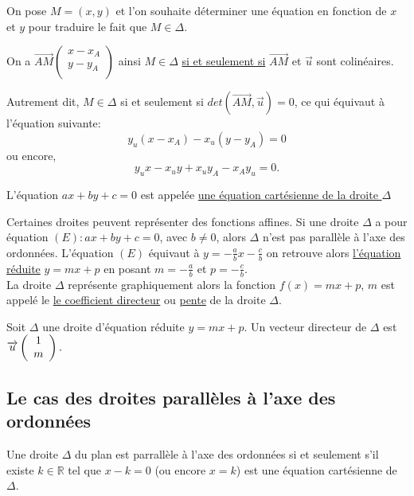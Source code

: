 \documentclass[french]{book}
\begin{document}
On pose $M=(x,y)$ et l'on souhaite déterminer une équation en fonction de $x$ et $y$ pour traduire le fait que $M \in \Delta$. 

On a $\overrightarrow{AM} \left( \begin{array}{c}
x-x_A \\
y-y_A \\
\end{array} \right)  
$ ainsi $M \in \Delta$ \underline{si et seulement si} $\overrightarrow{AM}$ et $\overrightarrow{u}$ sont colinéaires.

Autrement dit, $M \in \Delta$ si et seulement si $det(\overrightarrow{AM},\overrightarrow{u})=0$, ce qui équivaut à l'équation suivante:
 $$y_u(x-x_A) -x_u(y-y_A)=0$$
ou encore, 
$$y_u x - x_u y + x_u y_A - x_A y_u = 0 .$$
 
\begin{defn}
L'équation $ax+by+c=0$ est appelée \underline{une équation cartésienne de la droite $\Delta$}
\vspace{3mm}
\end{defn}

Certaines droites peuvent représenter des fonctions affines. Si une droite $\Delta$ a pour équation $(E): ax+by+c=0$, avec $b \neq 0$, alors $\Delta$ n'est pas parallèle à l'axe des ordonnées. L'équation $(E)$ équivaut à $y=- \frac{a}{b} x - \frac{c}{b}$ on retrouve alors \underline{l'équation réduite}  $y=mx+p$ en posant $m=-\frac{a}{b}$ et $p=-\frac{c}{b}$.\\

La droite $\Delta$ représente graphiquement alors la fonction $f(x)=mx+p$, $m$ est appelé le \underline{ le coefficient directeur} ou \underline{pente} de la droite $\Delta$.

\begin{prop}
Soit $\Delta$ une droite d'équation réduite $y=mx+p$. Un vecteur directeur de $\Delta$ est $\overrightarrow{u} \left( \begin{array}{c}
1 \\
m \\
\end{array} \right). \\ 
$
\end{prop}

\subsection*{Le cas des droites parallèles à l'axe des ordonnées}
\begin{prop}
Une droite $\Delta$ du plan est parrallèle à l'axe des ordonnées si et seulement s'il existe $k \in \mathbb{R}$ tel que $x-k=0$ (ou encore $x=k$) est une équation cartésienne de $\Delta$. 
\end{prop}
\end{document}
